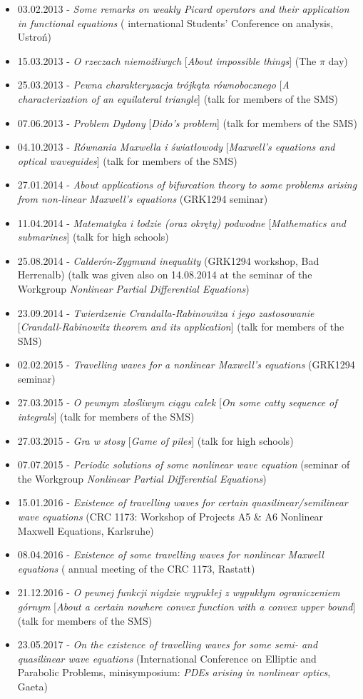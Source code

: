 \begin{itemize}
  \item 03.02.2013 - \textsl{Some remarks on weakly Picard operators and their application in functional equations} ( international Students' Conference on analysis, Ustroń)
  \item 15.03.2013 - \textsl{O rzeczach niemożliwych} [\textsl{About impossible things}] (The $\pi$ day)
  \item 25.03.2013 - \textsl{Pewna charakteryzacja trójkąta równobocznego} [\textsl{A characterization of an equilateral triangle}] (talk for members of the SMS)
  \item 07.06.2013 - \textsl{Problem Dydony} [\textsl{Dido's problem}] (talk for members of the SMS)
  \item 04.10.2013 - \textsl{Równania Maxwella i światłowody} [\textsl{Maxwell's equations and optical waveguides}] (talk for members of the SMS)
  \item 27.01.2014 - \textsl{About applications of bifurcation theory to some problems arising from non-linear Maxwell's equations} (GRK1294 seminar)
  \item 11.04.2014 - \textsl{Matematyka i łodzie (oraz okręty) podwodne} [\textsl{Mathematics and submarines}] (talk for high schools)
  \item 25.08.2014 - \textsl{Calderón-Zygmund inequality} (GRK1294 workshop, Bad Herrenalb) (talk was given also on 14.08.2014 at the seminar of the Workgroup \textit{Nonlinear Partial Differential Equations})
  \item 23.09.2014 - \textsl{Twierdzenie Crandalla-Rabinowitza i jego zastosowanie} [\textsl{Crandall-Rabinowitz theorem and its application}] (talk for members of the SMS)
  \item 02.02.2015 - \textsl{Travelling waves for a nonlinear Maxwell's equations} (GRK1294 seminar)
  \item 27.03.2015 - \textsl{O pewnym złośliwym ciągu całek} [\textsl{On some catty sequence of integrals}] (talk for members of the SMS)
  \item 27.03.2015 - \textsl{Gra w stosy} [\textsl{Game of piles}] (talk for high schools)
  \item 07.07.2015 - \textsl{Periodic solutions of some nonlinear wave equation} (seminar of the Workgroup \textit{Nonlinear Partial Differential Equations})
  \item 15.01.2016 - \textsl{Existence of travelling waves for certain quasilinear/semilinear wave equations} (CRC 1173: Workshop of Projects A5 \& A6 Nonlinear Maxwell Equations, Karlsruhe)
  \item 08.04.2016 - \textsl{Existence of some travelling waves for nonlinear Maxwell equations} ( annual meeting of the CRC 1173, Rastatt)
  \item 21.12.2016 - \textsl{O pewnej funkcji nigdzie wypukłej z wypukłym ograniczeniem górnym} [\textsl{About a certain nowhere convex function with a convex upper bound}] (talk for members of the SMS)
  \item 23.05.2017 - \textsl{On the existence of travelling waves for some semi- and quasilinear wave equations} (International Conference on Elliptic and Parabolic Problems, minisymposium: \textit{PDEs arising in nonlinear optics}, Gaeta)
\end{itemize}
